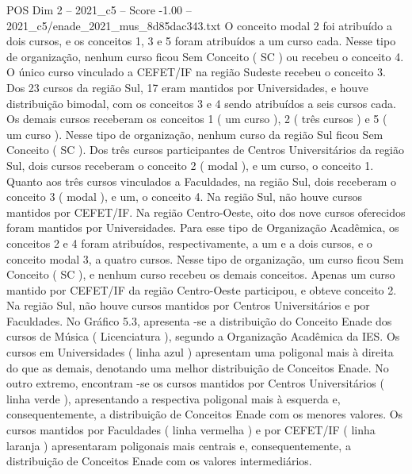 \begin{textsample}{POS Dim 2 – 2021\_c5 – Score -1.00 – 2021\_c5/enade\_2021\_mus\_8d85dac343.txt}
O conceito modal 2 foi atribuído a dois cursos, e os conceitos 1, 3 e 5 foram atribuídos a um curso cada.
Nesse tipo de organização, nenhum curso ficou Sem Conceito ( SC ) ou recebeu o conceito 4.
O único curso vinculado a CEFET/IF na região Sudeste recebeu o conceito 3.
Dos 23 cursos da região Sul, 17 eram mantidos por Universidades, e houve distribuição bimodal, com os conceitos 3 e 4 sendo atribuídos a seis cursos cada.
Os demais cursos receberam os conceitos 1 ( um curso ), 2 ( três cursos ) e 5 ( um curso ).
Nesse tipo de organização, nenhum curso da região Sul ficou Sem Conceito ( SC ).
Dos três cursos participantes de Centros Universitários da região Sul, dois cursos receberam o conceito 2 ( modal ), e um curso, o conceito 1.
Quanto aos três cursos vinculados a Faculdades, na região Sul, dois receberam o conceito 3 ( modal ), e um, o conceito 4.
Na região Sul, não houve cursos mantidos por CEFET/IF.
Na região Centro-Oeste, oito dos nove cursos oferecidos foram mantidos por Universidades.
Para esse tipo de Organização Acadêmica, os conceitos 2 e 4 foram atribuídos, respectivamente, a um e a dois cursos, e o conceito modal 3, a quatro cursos.
Nesse tipo de organização, um curso ficou Sem Conceito ( SC ), e nenhum curso recebeu os demais conceitos.
Apenas um curso mantido por CEFET/IF da região Centro-Oeste participou, e obteve conceito 2.
Na região Sul, não houve cursos mantidos por Centros Universitários e por Faculdades.
No Gráfico 5.3, apresenta -se a distribuição do Conceito Enade dos cursos de Música ( Licenciatura ), segundo a Organização Acadêmica da IES.
Os cursos em Universidades ( linha azul ) apresentam uma poligonal mais à direita do que as demais, denotando uma melhor distribuição de Conceitos Enade.
No outro extremo, encontram -se os cursos mantidos por Centros Universitários ( linha verde ), apresentando a respectiva poligonal mais à esquerda e, consequentemente, a distribuição de Conceitos Enade com os menores valores.
Os cursos mantidos por Faculdades ( linha vermelha ) e por CEFET/IF ( linha laranja ) apresentaram poligonais mais centrais e, consequentemente, a distribuição de Conceitos Enade com os valores intermediários.

\end{textsample}
